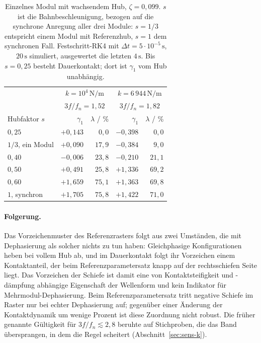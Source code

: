 \documentclass[12pt,a4paper]{report}
\begin{document}
\begin{table}[htbp]
  \centering
  \begin{tabular}{lrrrr}
    \hline
    & \multicolumn{2}{c}{$k = 10^{4}\,\mathrm{N/m}$} & \multicolumn{2}{c}{$k = 6\,944\,\mathrm{N/m}$} \\
    & \multicolumn{2}{c}{$3f/f_n = 1{,}52$} & \multicolumn{2}{c}{$3f/f_n = 1{,}82$} \\
    Hubfaktor $s$ & $\gamma_1$ & $\lambda$ / \% & $\gamma_1$ & $\lambda$ / \% \\
    \hline
    $0{,}25$             & $+0{,}143$ & $0{,}0$  & $-0{,}398$ & $0{,}0$  \\
    $1/3$, ein Modul     & $+0{,}090$ & $17{,}9$ & $-0{,}384$ & $9{,}0$  \\
    $0{,}40$             & $-0{,}006$ & $23{,}8$ & $-0{,}210$ & $21{,}1$ \\
    $0{,}50$             & $+0{,}491$ & $25{,}8$ & $+1{,}336$ & $69{,}2$ \\
    $0{,}60$             & $+1{,}659$ & $75{,}1$ & $+1{,}363$ & $69{,}8$ \\
    $1$, synchron        & $+1{,}705$ & $75{,}8$ & $+1{,}422$ & $71{,}0$ \\
    \hline
  \end{tabular}
  \caption{Einzelnes Modul mit wachsendem Hub, $\zeta = 0{,}099$.
  $s$ ist die Bahnbeschleunigung, bezogen auf die synchrone Anregung
  aller drei Module: $s = 1/3$ entspricht einem Modul mit Referenzhub,
  $s = 1$ dem synchronen Fall. Festschritt-RK4 mit
  $\Delta t = 5\cdot10^{-5}\,\mathrm{s}$, $20\,\mathrm{s}$ simuliert,
  ausgewertet die letzten $4\,\mathrm{s}$. Bis $s = 0{,}25$ besteht
  Dauerkontakt; dort ist $\gamma_1$ vom Hub unabhängig.}
  \label{tab:gegenprobe}
\end{table}

\paragraph{Folgerung.}
Das Vorzeichenmuster des Referenzrasters folgt aus zwei Umständen, die
mit Dephasierung als solcher nichts zu tun haben: Gleichphasige
Konfigurationen heben bei vollem Hub ab, und im Dauerkontakt folgt ihr
Vorzeichen einem Kontaktanteil, der beim Referenzparametersatz knapp auf
der rechtsschiefen Seite liegt. Das Vorzeichen der Schiefe ist damit eine
von Kontaktsteifigkeit und -dämpfung abhängige Eigenschaft der
Wellenform und kein Indikator für Mehrmodul-Dephasierung. Beim
Referenzparametersatz tritt negative Schiefe im Raster nur bei echter
Dephasierung auf; gegenüber einer Änderung der Kontaktdynamik um wenige
Prozent ist diese Zuordnung nicht robust. Die früher genannte Gültigkeit
für $3f/f_n \lesssim 2{,}8$ beruhte auf Stichproben, die das Band
übersprangen, in dem die Regel scheitert (Abschnitt~\ref{sec:sens-k}).
\end{document}
